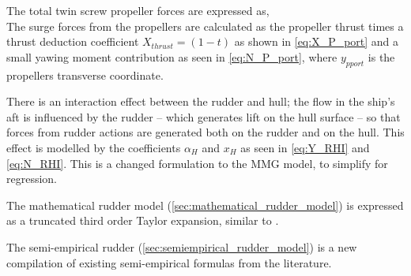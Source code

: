 The total twin screw propeller forces are expressed as,
\begin{equation}
    \label{eq:X_P}
    
\end{equation}
%
\begin{equation}
    \label{eq:Y_P}
    
\end{equation}
%
\begin{equation}
    \label{eq:N_P}
    
\end{equation}
The surge forces from the propellers are calculated as the propeller thrust times a thrust deduction coefficient $X_{thrust}=(1-t)$ as shown in \autoref{eq:X_P_port} and a small yawing moment contribution as seen in \autoref{eq:N_P_port}, where $y_{pport}$ is the propellers transverse coordinate.
\begin{equation}
    \label{eq:X_P_port}
    
\end{equation}
\begin{equation}
    \label{eq:N_P_port}
    
\end{equation}

There is an interaction effect between the rudder and hull; the flow in the ship's aft is influenced by the rudder -- which generates lift on the hull surface -- so that forces from rudder actions are generated both on the rudder and on the hull. This effect is modelled by the coefficients $\alpha_H$ and $x_H$ as seen in \autoref{eq:Y_RHI} and \autoref{eq:N_RHI}. This is a changed formulation to the MMG model, to simplify for regression.
\begin{equation}
    \label{eq:Y_RHI}
    
\end{equation}
%
\begin{equation}
    \label{eq:N_RHI}
    
\end{equation}

The mathematical rudder model (\autoref{sec:mathematical_rudder_model}) is expressed as a truncated third order Taylor expansion, similar to \citet{abkowitz_ship_1964}. 

The semi-empirical rudder (\autoref{sec:semiempirical_rudder_model}) is a new compilation of existing semi-empirical formulas from the literature.
